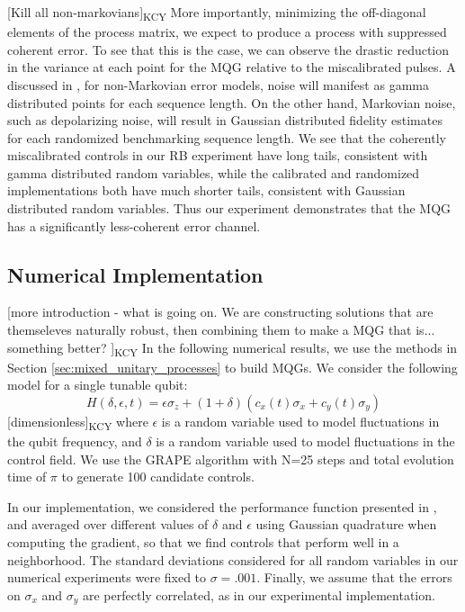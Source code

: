 \documentclass[aps,nofootinbib,pra,notitlepage,twocolumn]{revtex4-1}
\newcommand{\kcy}[1]{{\color{red}[#1]\textsubscript{\rm{KCY}}}}
\begin{document}
\kcy{Kill all non-markovians}
More importantly, minimizing the off-diagonal elements of the process matrix, we expect to produce a process with suppressed coherent error. To see that this is the case, we can observe the drastic reduction in the variance at each point for the MQG relative to the miscalibrated pulses. A discussed in \cite{Ball2016}, for non-Markovian error models, noise will manifest as gamma distributed points for each sequence length. On the other hand, Markovian noise, such as depolarizing noise, will result in Gaussian distributed fidelity estimates for each randomized benchmarking sequence length. We see that the coherently miscalibrated controls in our RB experiment have long tails, consistent with gamma distributed random variables, while the calibrated and randomized implementations both have much shorter tails, consistent with Gaussian distributed random variables. Thus our experiment demonstrates that the MQG has a significantly less-coherent error channel.


\subsection{Numerical Implementation}
\label{sec:numerical_results}
\kcy{more introduction - what is going on. We are constructing solutions that are themseleves naturally robust, then combining them to make a MQG that is... something better? }
In the following numerical results, we use the methods in Section \ref{sec:mixed_unitary_processes} to build MQGs. We consider the following model for a single tunable qubit: 
\begin{equation}\label{eq:1Qham}
  H(\delta, \epsilon, t) = \epsilon\sigma_z + (1 + \delta)(c_x(t)\sigma_x + c_y(t)\sigma_y)
\end{equation}
\kcy{dimensionless}
where $\epsilon$ is a random variable used to model fluctuations in the qubit frequency, and $\delta$ is a random variable used to model fluctuations in the control field. We use the GRAPE algorithm\cite{Khaneja2005} with N=25 steps and total evolution time of $\pi$ to generate 100 candidate controls. 

In our implementation, we considered the performance function presented in \cite{Khaneja2005}, and averaged over different values of $\delta$ and $\epsilon$ using Gaussian quadrature when computing the gradient, so that we find controls that perform well in a neighborhood. The standard deviations considered for all random variables in our numerical experiments were fixed to $\sigma=.001$. Finally, we assume that the errors on $\sigma_x$ and $\sigma_y$ are perfectly correlated, as in our experimental implementation.
\end{document}
